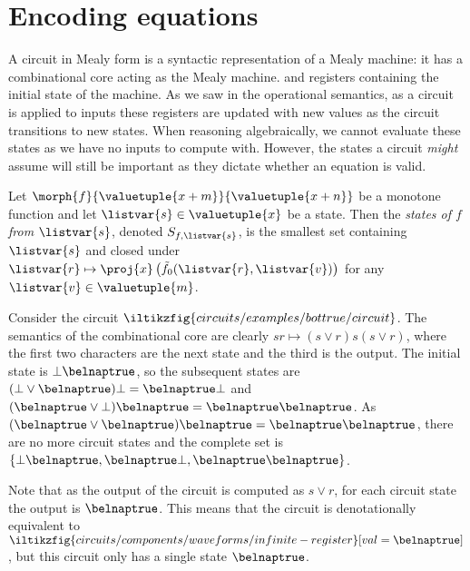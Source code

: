 \section{Encoding equations}

A circuit in Mealy form is a syntactic representation of a Mealy machine: it
has a combinational core acting as the Mealy machine. and registers containing
the initial state of the machine.
As we saw in the operational semantics, as a circuit is applied to inputs these
registers are updated with new values as the circuit transitions to new states.
When reasoning algebraically, we cannot evaluate these states as we have no
inputs to compute with.
However, the states a circuit \emph{might} assume will still be important as
they dictate whether an equation is valid.

\begin{definition}[States]
    Let \(\morph{f}{\valuetuple{x+m}}{\valuetuple{x+n}}\) be a
    monotone function and let \(\listvar{s} \in  \valuetuple{x}\) be a state.
    Then the \emph{states of \(f\) from \(\listvar{s}\)}, denoted
    \(S_{f,\listvar{s}}\), is the smallest set containing \(\listvar{s}\) and
    closed under \(
    \listvar{r}
    \mapsto
    \proj{x}\left(\tilde{f}_0(\listvar{r},\listvar{v})\right)
    \) for any \(\listvar{v} \in \valuetuple{m}\).
\end{definition}

\begin{example}\label{ex:circuit-states}
    Consider the circuit \(
    \iltikzfig{circuits/examples/bottrue/circuit}
    \).
    The semantics of the combinational core are clearly
    \(sr \mapsto (s \lor r)s(s \lor r)\), where the first two characters are the
    next state and the third is the output.
    The initial state is \(\bot\belnaptrue\), so the subsequent states are
    \((\bot \lor \belnaptrue)\bot = \belnaptrue\bot\) and
    \((\belnaptrue \lor \bot)\belnaptrue = \belnaptrue\belnaptrue\).
    As \((\belnaptrue \lor \belnaptrue)\belnaptrue = \belnaptrue\belnaptrue\),
    there are no more circuit states and the complete set is
    \(\{\bot\belnaptrue,\belnaptrue\bot,\belnaptrue\belnaptrue\}\).

    Note that as the output of the circuit is computed as \(s \lor r\), for each
    circuit state the output is \(\belnaptrue\).
    This means that the circuit is denotationally equivalent to \(
    \iltikzfig{circuits/components/waveforms/infinite-register}[val=\belnaptrue]
    \), but this circuit only has a single state \(\belnaptrue\).
\end{example}

